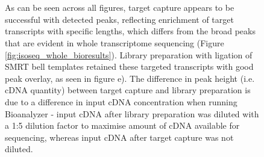 \begin{figure}[!htp]
{	\\
	\\
	As can be seen across all figures, target capture appears to be successful with detected peaks, reflecting enrichment of target transcripts with specific lengths, which differs from the broad peaks that are evident in whole transcriptome sequencing (Figure \ref{fig:isoseq_whole_bioresults}). Library preparation with ligation of SMRT bell templates retained these targeted transcripts with good peak overlay, as seen in figure e). The difference in peak height (i.e. cDNA quantity) between target capture and library preparation is due to a difference in input cDNA concentration when running Bioanalyzer - input cDNA after library preparation was diluted with a 1:5 dilution factor to maximise amount of cDNA available for sequencing, whereas input cDNA after target capture was not diluted.}  
	\label{fig:isoseq_targeted_libresults}
\end{figure}

